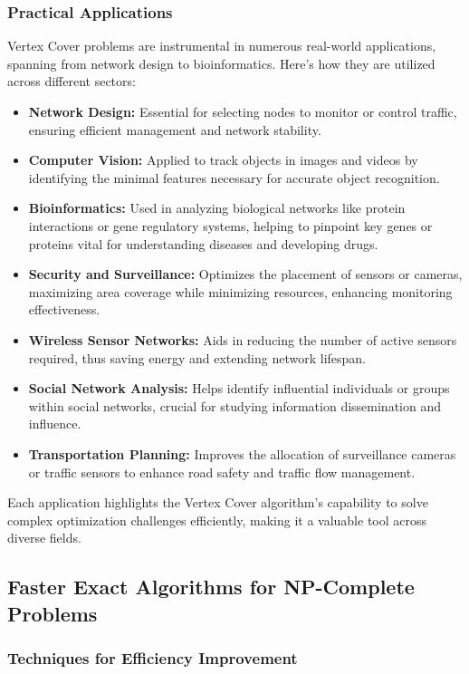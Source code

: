 \subsubsection{Practical Applications}

Vertex Cover problems are instrumental in numerous real-world applications, spanning from network design to bioinformatics. Here’s how they are utilized across different sectors:

\begin{itemize}
    \item \textbf{Network Design:} Essential for selecting nodes to monitor or control traffic, ensuring efficient management and network stability.
    \item \textbf{Computer Vision:} Applied to track objects in images and videos by identifying the minimal features necessary for accurate object recognition.
    \item \textbf{Bioinformatics:} Used in analyzing biological networks like protein interactions or gene regulatory systems, helping to pinpoint key genes or proteins vital for understanding diseases and developing drugs.
    \item \textbf{Security and Surveillance:} Optimizes the placement of sensors or cameras, maximizing area coverage while minimizing resources, enhancing monitoring effectiveness.
    \item \textbf{Wireless Sensor Networks:} Aids in reducing the number of active sensors required, thus saving energy and extending network lifespan.
    \item \textbf{Social Network Analysis:} Helps identify influential individuals or groups within social networks, crucial for studying information dissemination and influence.
    \item \textbf{Transportation Planning:} Improves the allocation of surveillance cameras or traffic sensors to enhance road safety and traffic flow management.
\end{itemize}

Each application highlights the Vertex Cover algorithm’s capability to solve complex optimization challenges efficiently, making it a valuable tool across diverse fields.


\subsection{Faster Exact Algorithms for NP-Complete Problems}

\subsubsection{Techniques for Efficiency Improvement}

